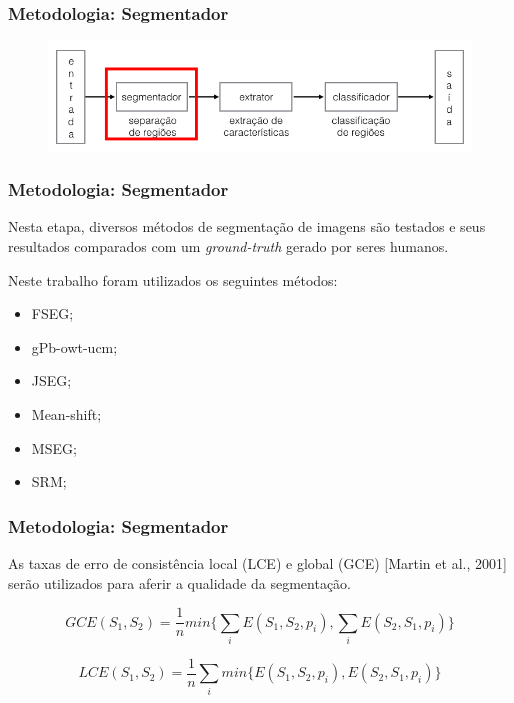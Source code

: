 \documentclass[t]{beamer}
\begin{document}
\begin{frame}[c]
	\frametitle{Metodologia: Segmentador}
	\begin{figure}[h]
    	\includegraphics[width=\textwidth]{imgs/arquitetura_2}
	\end{figure}
\end{frame}

\begin{frame}[c]
	\frametitle{Metodologia: Segmentador}

	Nesta etapa, diversos métodos de segmentação de imagens são testados e seus resultados comparados com um \textit{ground-truth} gerado por seres humanos.

	\vspace{0.5cm}

	Neste trabalho foram utilizados os seguintes métodos:
	\begin{itemize}
		\item FSEG;
		\item gPb-owt-ucm;
		\item JSEG;
		\item Mean-shift;
		\item MSEG;
		\item SRM;
	\end{itemize}

\end{frame}

\begin{frame}[c]
	\frametitle{Metodologia: Segmentador}

	As taxas de erro de consistência local (LCE) e global (GCE) [Martin et al., 2001] serão utilizados para aferir a qualidade da segmentação.

	\begin{equation*}
		\displaystyle GCE(S_1,S_2) = \frac{1}{n} min \biggl\{ \sum_{i} E(S_1,S_2,p_i), \sum_{i} E(S_2,S_1,p_i) \biggr\}
	\end{equation*}

	\begin{equation*}
		\displaystyle LCE(S_1,S_2) = \frac{1}{n} \sum_{i} min \biggl\{ E(S_1,S_2,p_i), E(S_2,S_1,p_i) \biggr\}
	\end{equation*}
\end{frame}
\end{document}

